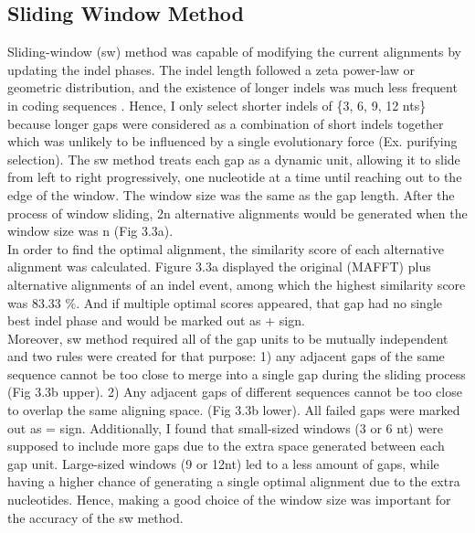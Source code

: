 \subsection{Sliding Window Method}
Sliding-window (sw) method was capable of modifying the current alignments by updating the indel phases. The indel length followed a zeta power-law or geometric distribution, and the existence of longer indels was much less frequent in coding sequences \parencite{cartwright2009}. Hence, I only select shorter indels of \{3, 6, 9, 12 nts\} because longer gaps were considered as a combination of short indels together which was unlikely to be influenced by a single evolutionary force (Ex. purifying selection). The sw method treats each gap as a dynamic unit, allowing it to slide from left to right progressively, one nucleotide at a time until reaching out to the edge of the window. The window size was the same as the gap length. After the process of window sliding, 2n alternative alignments would be generated when the window size was n (Fig 3.3a). \\
\indent In order to find the optimal alignment, the similarity score of each alternative alignment was calculated. Figure 3.3a displayed the original (MAFFT) plus alternative alignments of an indel event, among which the highest similarity score was 83.33 $\%$. And if multiple optimal scores appeared, that gap had no single best indel phase and would be marked out as + sign. \\
\indent Moreover, sw method required all of the gap units to be mutually independent and two  rules were created for that purpose: 1) any adjacent gaps of the same sequence cannot be too close to merge into a single gap during the sliding process (Fig 3.3b upper). 2) Any adjacent gaps of different sequences cannot be too close to overlap the same aligning space. (Fig 3.3b lower). All failed gaps were marked out as = sign. 
Additionally, I found that small-sized windows (3 or 6 nt) were supposed to include more gaps due to the extra space generated between each gap unit. Large-sized windows (9 or 12nt) led to a less amount of gaps, while having a higher chance of generating a single optimal alignment due to the extra nucleotides. Hence, making a good choice of the window size was important for the accuracy of the sw method.

